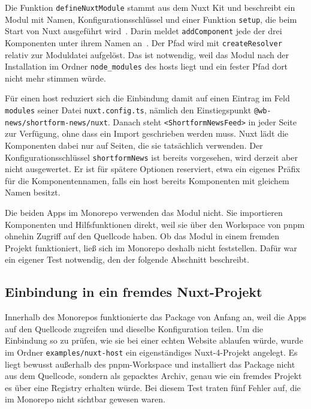 Die Funktion \texttt{defineNuxtModule} stammt aus dem Nuxt Kit und beschreibt ein Modul mit Namen, Konfigurationsschlüssel und einer Funktion \texttt{setup}, die beim Start von Nuxt ausgeführt wird~\cite{nuxtmodules}.
Darin meldet \texttt{addComponent} jede der drei Komponenten unter ihrem Namen an~\cite{nuxtkitcomponents}.
Der Pfad wird mit \texttt{createResolver} relativ zur Moduldatei aufgelöst.
Das ist notwendig, weil das Modul nach der Installation im Ordner \texttt{node\_modules} des \gls{host}s liegt und ein fester Pfad dort nicht mehr stimmen würde.

Für einen \gls{host} reduziert sich die Einbindung damit auf einen Eintrag im Feld \texttt{modules} seiner Datei \texttt{nuxt.config.ts}, nämlich den Einstiegspunkt \texttt{@wb-news/\allowbreak{}shortform-news/\allowbreak{}nuxt}.
Danach steht \texttt{<ShortformNewsFeed>} in jeder Seite zur Verfügung, ohne dass ein Import geschrieben werden muss.
Nuxt lädt die Komponenten dabei nur auf Seiten, die sie tatsächlich verwenden.
Der Konfigurationsschlüssel \texttt{shortformNews} ist bereits vorgesehen, wird derzeit aber nicht ausgewertet.
Er ist für spätere Optionen reserviert, etwa ein eigenes Präfix für die Komponentennamen, falls ein \gls{host} bereits Komponenten mit gleichem Namen besitzt.

Die beiden Apps im Monorepo verwenden das Modul nicht.
Sie importieren Komponenten und Hilfsfunktionen direkt, weil sie über den Workspace von pnpm ohnehin Zugriff auf den Quellcode haben.
Ob das Modul in einem fremden Projekt funktioniert, ließ sich im Monorepo deshalb nicht feststellen.
Dafür war ein eigener Test notwendig, den der folgende Abschnitt beschreibt.

\subsection{Einbindung in ein fremdes Nuxt-Projekt}\label{sec:feed:package:host}

Innerhalb des Monorepos funktionierte das Package von Anfang an, weil die Apps auf den Quellcode zugreifen und dieselbe Konfiguration teilen.
Um die Einbindung so zu prüfen, wie sie bei einer echten Website ablaufen würde, wurde im Ordner \texttt{examples/nuxt-host} ein eigenständiges Nuxt-4-Projekt angelegt.
Es liegt bewusst außerhalb des pnpm-Workspace und installiert das Package nicht aus dem Quellcode, sondern als gepacktes Archiv, genau wie ein fremdes Projekt es über eine Registry erhalten würde.
Bei diesem Test traten fünf Fehler auf, die im Monorepo nicht sichtbar gewesen waren.

